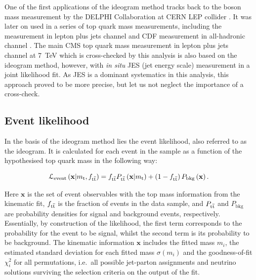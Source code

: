 One of the first applications of the ideogram method tracks back to the \W boson mass measurement by the \textsc{DELPHI}
Collaboration at CERN LEP collider \autocite{DELPHI_1998, DELPHI_2008}. It was later on used in a series of top quark
mass measurements, including the \Dzero measurement in lepton plus jets channel \autocite{D0_top_mass_ljets_ideogram}
and CDF measurement in all-hadronic channel \autocite{CDF_ideogram}. The main CMS top quark mass measurement in lepton
plus jets channel at \SI{7}{\TeV} \autocite{top_mass_ljets_CMS} which is cross-checked by this analysis is also based on
the ideogram method, however, with \textit{in situ} JES (jet energy scale) measurement in a joint likelihood fit. As JES
is a dominant systematics in this analysis, this approach proved to be more precise, but let us not neglect the
importance of a cross-check.

\subsection{Event likelihood}
\label{ss_top_mass:event_likelihood}
In the basis of the ideogram method lies the event likelihood, also referred to as the ideogram. It is calculated for
each event in the sample as a function of the hypothesised top quark mass \mtop in the following way:

\begin{equation}
\mathcal{L}_\textrm{event} \left(\mathbf{x}|m_\mathrm{t}, f_{\mathrm{t}\overline{\mathrm{t}}} \right) = f_{\mathrm{t}\overline{\mathrm{t}}} P_{\mathrm{t}\overline{\mathrm{t}}}
\left(\mathbf{x}|m_\mathrm{t}\right) + \left(1 - f_{\mathrm{t}\overline{\mathrm{t}}} \right)P_\textrm{bkg}\left(\mathbf{x}\right).
\label{eq:event_likelihood}
\end{equation}

Here $\mathbf{x}$ is the set of event observables with the top mass information from the kinematic fit, $f_{\mathrm{t}\overline{\mathrm{t}}}$ is
the fraction of \ttbar events in the data sample, and $P_{\mathrm{t}\overline{\mathrm{t}}}$ and $P_\textrm{bkg}$ are probability densities for
signal and background events, respectively. Essentially, by construction of the likelihood, the first term corresponds
to the probability for the event to be signal, whilst the second term is its probability to be background. The kinematic
information $\mathbf{x}$ includes the fitted mass $m_{i}$, the estimated standard deviation for each fitted mass
$\sigma(m_{i})$ and the goodness-of-fit $\chi^{2}_{i}$ for all permutations, i.e.\ all possible jet-parton assignments
and neutrino solutions surviving the selection criteria on the output of the fit.

